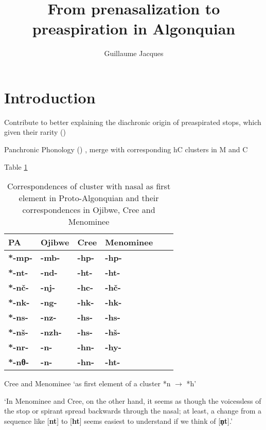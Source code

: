 \documentclass[oneside,a4paper,11pt]{article}
\newcommand{\ipa}[1]{{\phon\mbox{\textbf{#1}}}}
\newcommand{\phonet}[1]{[{\phon\mbox{\textbf{#1}}}]}
\begin{document}
 
\title{From prenasalization to preaspiration in Algonquian}
\author{Guillaume Jacques}
\maketitle
 
 \section{Introduction}
 

Contribute to better explaining the diachronic origin of preaspirated stops, which given their rarity (\citealt{silverman03preaspirated})

Panchronic Phonology (\citealt{michaud-jacques12nasalite})
\citet[154-5]{bloomfield25central}
 \citet{bloomfield46proto}, merge with corresponding hC clusters in M and C
 \citet{goddard98arapaho}
 
Table \ref{tab:nC.PA} 
 
 \begin{table}
\caption{Correspondences of cluster with nasal as first element in Proto-Algonquian and their correspondences in Ojibwe, Cree and Menominee} \label{tab:nC.PA} \centering
\begin{tabular}{llllll}
\toprule
PA & Ojibwe & Cree & Menominee \\
\midrule
\ipa{*-mp-} & \ipa{-mb-} & \ipa{-hp-} & \ipa{-hp-} \\
\ipa{*-nt-} & \ipa{-nd-} & \ipa{-ht-} & \ipa{-ht-} \\
\ipa{*-nč-} & \ipa{-nj-} & \ipa{-hc-} & \ipa{-hč-} \\
\ipa{*-nk-} & \ipa{-ng-} & \ipa{-hk-} & \ipa{-hk-} \\
\ipa{*-ns-} & \ipa{-nz-} & \ipa{-hs-} & \ipa{-hs-} \\
\ipa{*-nš-} & \ipa{-nzh-} & \ipa{-hs-} & \ipa{-hš-} \\
\ipa{*-nr-} & \ipa{-n-} & \ipa{-hn-} & \ipa{-hy-} \\
\ipa{*-nθ-} & \ipa{-n-} & \ipa{-hn-} & \ipa{-ht-} \\
\bottomrule
\end{tabular}
\end{table}
 Cree and Menominee
\citealt[60]{hockett81menominee}  `as first element of a cluster *n $\rightarrow$ *h'

`In Menominee and Cree, on the other hand, it seems as though the voicessless of the stop or spirant spread backwards through the nasal; at least, a change from a sequence like \phonet{nt} to \phonet{ht} seems easiest to understand if we think of \phonet{n̥t}.'
\end{document}
